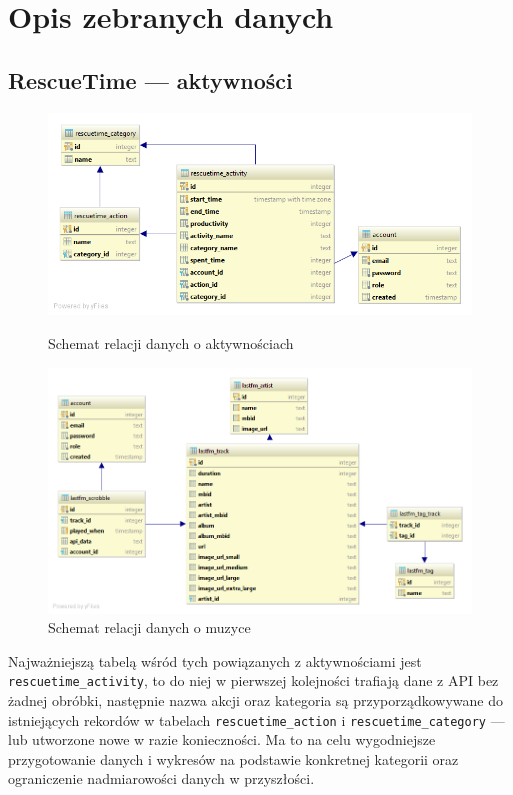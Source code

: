 \documentclass[openright]{xmgr}
\begin{document}
\section{Opis zebranych danych}

    \subsection*{RescueTime --- aktywności}
    \begin{figure}
        \includegraphics[width=\linewidth]{fig/db-rescuetime-schema.png}
        \caption{Schemat relacji danych o aktywnościach}
        \label{fig:db-rescuetime-schema}

        \vspace*{\floatsep}%

        \includegraphics[width=\linewidth]{fig/db-lastfm-schema.png}
        \caption{Schemat relacji danych o muzyce}
        \label{fig:db-lastfm-schema}

    \end{figure}

    Najważniejszą tabelą wśród tych powiązanych z aktywnościami jest \verb|rescuetime_activity|,
    to do niej w pierwszej kolejności trafiają dane z API bez żadnej obróbki,
    następnie nazwa akcji oraz kategoria są przyporządkowywane do istniejących rekordów w tabelach
    \verb|rescuetime_action| i \verb|rescuetime_category| --- lub utworzone nowe w razie konieczności.
    Ma to na celu wygodniejsze przygotowanie danych i wykresów na podstawie konkretnej kategorii
    oraz ograniczenie nadmiarowości danych w przyszłości.
\end{document}
